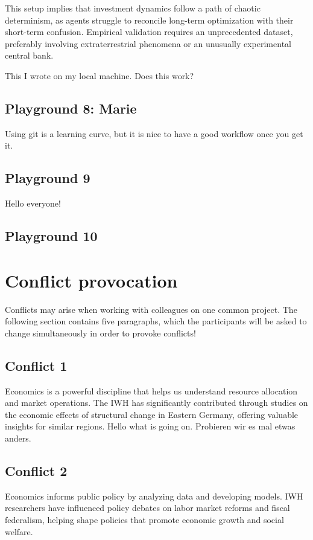\documentclass{article}
\begin{document}
This setup implies that investment dynamics follow a path of chaotic determinism, as agents struggle to reconcile long-term optimization with their short-term confusion. Empirical validation requires an unprecedented dataset, preferably involving extraterrestrial phenomena or an unusually experimental central bank.

This I wrote on my local machine. Does this work?


\subsection{Playground 8: Marie}

Using git is a learning curve, but it is nice to have a good workflow once you get it. 

\subsection{Playground 9}
Hello everyone!
\subsection{Playground 10}




\section{Conflict provocation}
Conflicts may arise when working with colleagues on one common project. The following section contains five paragraphs, which the participants will be asked to change simultaneously in order to provoke conflicts!

\subsection{Conflict 1}
Economics is a powerful discipline that helps us understand resource allocation and market operations. The IWH has significantly contributed through studies on the economic effects of structural change in Eastern Germany, offering valuable insights for similar regions.
Hello what is going on. Probieren wir es mal etwas anders.

\subsection{Conflict 2}
Economics informs public policy by analyzing data and developing models. IWH researchers have influenced policy debates on labor market reforms and fiscal federalism, helping shape policies that promote economic growth and social welfare.
\end{document}
